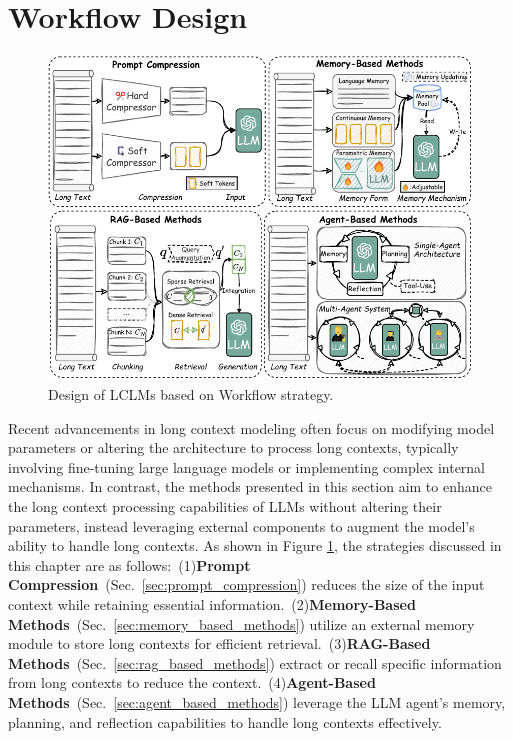 \documentclass[11pt, a4paper, logo, copyright, nonumbering]{map}
\begin{document}
\section{Workflow Design}
\label{sec:workflow}

\begin{figure}[t]
    \centering
    \includegraphics[width=\linewidth]{graphs/workflow.pdf}
    \caption{Design of LCLMs based on Workflow strategy.}
    \label{fig:workflow}
\end{figure}

Recent advancements in long context modeling often focus on modifying model parameters or altering the architecture to process long contexts, typically involving fine-tuning large language models or implementing complex internal mechanisms. In contrast, the methods presented in this section aim to enhance the long context processing capabilities of LLMs without altering their parameters, instead leveraging external components to augment the model's ability to handle long contexts. As shown in Figure \ref{fig:workflow}, the strategies discussed in this chapter are as follows:~(1)\textbf{Prompt Compression}~(Sec.~\ref{sec:prompt_compression}) reduces the size of the input context while retaining essential information.~(2)\textbf{Memory-Based Methods}~(Sec.~\ref{sec:memory_based_methods}) utilize an external memory module to store long contexts for efficient retrieval.~(3)\textbf{RAG-Based Methods}~(Sec.~\ref{sec:rag_based_methods}) extract or recall specific information from long contexts to reduce the context.~(4)\textbf{Agent-Based Methods}~(Sec.~\ref{sec:agent_based_methods}) leverage the LLM agent's memory, planning, and reflection capabilities to handle long contexts effectively.
\end{document}
